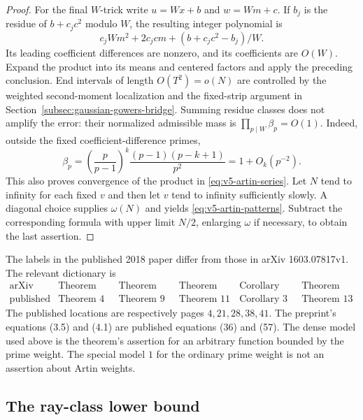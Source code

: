 \begin{proof}
For the final $W$-trick write $u=Wx+b$ and $w=Wm+c$.
If $b_j$ is the residue of $b+c_jc^2$ modulo $W$, the resulting integer
polynomial is
\[
 c_jWm^2+2c_jcm+(b+c_jc^2-b_j)/W.
\]
Its leading coefficient differences are nonzero, and its coefficients
are $O(W)$. Expand the product into its means and centered factors and
apply the preceding conclusion. End intervals of length $O(T^2)=o(N)$
are controlled by the weighted second-moment localization and the
fixed-strip argument in Section~\ref{subsec:gaussian-gowers-bridge}. Summing residue classes does not
amplify the error: their normalized admissible mass is
$\prod_{p\mid W}\beta_p=O(1)$.
Indeed, outside the fixed coefficient-difference primes,
\[
 \beta_p=\left(\frac p{p-1}\right)^k
                \frac{(p-1)(p-k+1)}{p^2}=1+O_k(p^{-2}).
\]
This also proves convergence of the product in
\eqref{eq:v5-artin-series}.
Let $N$ tend to infinity for each fixed $v$ and then let $v$ tend to
infinity sufficiently slowly. A diagonal choice supplies $\omega(N)$
and yields \eqref{eq:v5-artin-patterns}. Subtract the corresponding
formula with upper limit $N/2$, enlarging $\omega$ if necessary, to
obtain the last assertion.
\end{proof}

\begin{remark}\label{rem:v5-tz-numbering}
The labels in the published 2018 paper differ from those in arXiv
1603.07817v1. The relevant dictionary is
\[
\begin{array}{c|ccccc}
 \text{arXiv} &\text{Theorem 1.4}&\text{Theorem 2.5}&\text{Theorem 3.1}
               &\text{Corollary 3.9}&\text{Theorem 4.1}\\
 \text{published}&\text{Theorem 4}&\text{Theorem 9}&\text{Theorem 11}
               &\text{Corollary 3}&\text{Theorem 13}
\end{array}
\]
The published locations are respectively pages $4,21,28,38,41$.
The preprint's equations (3.5) and (4.1) are published equations (36)
and (57). The dense model used above is the theorem's assertion for an
arbitrary function bounded by the prime weight. The special model $1$
for the ordinary prime weight is not an assertion about Artin weights.
\end{remark}

\subsection{The ray-class lower bound}\label{subsec:v5-ray-density}

